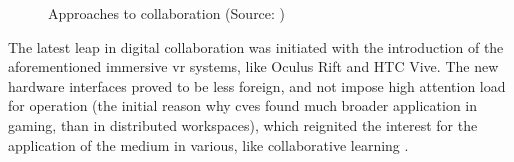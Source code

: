 \begin{figure}
	\centering
	\hfill
	\hfill
	\hfill
	\caption{Approaches to collaboration (Source: \parencite{churchill_collaborative_1998})}
	\label{fig:approaches_to_collaboration}
\end{figure}

The latest leap in digital collaboration was initiated with the introduction of the aforementioned immersive \gls{vr} systems, like Oculus Rift and HTC Vive. The new hardware interfaces proved to be less foreign, and not impose high attention load for operation (the initial reason why \gls{cve}s found much broader application in gaming, than in distributed workspaces), which reignited the interest for the application of the medium in various, like collaborative learning \parencite{greenwald_cocoverse_nodate}. 

